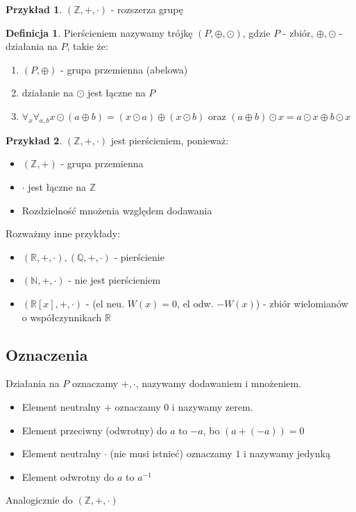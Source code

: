 \documentclass{article}
\theoremstyle{definition}
\newtheorem{de}{Definicja}[subsection]
\theoremstyle{definition}
\theoremstyle{definition}
\newtheorem{pk}{Przykład}[subsection]
\theoremstyle{definition}
\begin{document}
\begin{pk}
$(\mathbb{Z},+,\cdot)$ - rozszerza grupę
\end{pk}

\begin{de}
Pierścieniem nazywamy trójkę $(P,\oplus, \odot)$, gdzie $P$ - zbiór, $\oplus, \odot$ - działania na $P$, takie że:
\begin{enumerate}
\item $(P,\oplus)$ - grupa przemienna (abelowa)
\item działanie na $\odot$ jest łączne na $P$
\item $\forall_{x} \forall_{a,b} x\odot(a\oplus b) = (x\odot a)\oplus (x\odot b)$ oraz
$(a\oplus b)\odot x = a\odot x \oplus b\odot x$
\end{enumerate}
\end{de}

\begin{pk}
$(\mathbb{Z},+,\cdot)$ jest pierścieniem, ponieważ:
\begin{itemize}
\item $(\mathbb{Z},+)$ - grupa przemienna
\item $\cdot$ jest łączne na $\mathbb{Z}$
\item Rozdzielność mnożenia względem dodawania
\end{itemize}
Rozważmy inne przykłady:
\begin{itemize}
\item $(\mathbb{R},+, \cdot), (\mathbb{Q},+,\cdot)$ - pierścienie
\item $(\mathbb{N},+, \cdot)$ - nie jest pierścieniem
\item $(\mathbb{R}[x],+,\cdot)$ - (el neu. $W(x)=0$, el odw. $-W(x)$) - zbiór wielomianów o współczynnikach $\mathbb{R}$
\end{itemize}
\end{pk}

\subsection{Oznaczenia}
Działania na $P$ oznaczamy $+, \cdot$, nazywamy dodawaniem i mnożeniem.
\begin{itemize}
\item Element neutralny $+$ oznaczamy $0$ i nazywamy zerem.
\item Element przeciwny (odwrotny) do $a$ to $-a$, bo $(a+(-a))=0$
\item Element neutralny $\cdot$ (nie musi istnieć) oznaczamy $1$ i nazywamy jedynką
\item Element odwrotny do $a$ to $a^{-1}$
\end{itemize}
Analogicznie do $(\mathbb{Z},+,\cdot)$
\end{document}
